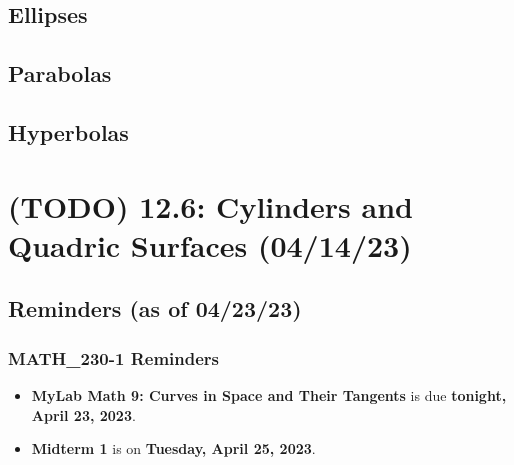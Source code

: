 \documentclass{report}
\begin{document}
\begin{sloppypar}
\section{Ellipses}
\begin{center}
\end{center}
\section{Parabolas}
\begin{center}
\end{center}
\section{Hyperbolas}
\begin{center}
\end{center}


\chapter{(TODO) 12.6: Cylinders and Quadric Surfaces (04/14/23)}
\section{Reminders (as of 04/23/23)}
\subsection{MATH\_230-1 Reminders}
\begin{itemize}
  \item \textbf{MyLab Math 9: Curves in Space and Their
        Tangents} is due \textbf{tonight, April 23, 2023}.
  \item \textbf{Midterm 1} is on \textbf{Tuesday, April
        25, 2023}.


\end{itemize}
\end{sloppypar}
\end{document}
